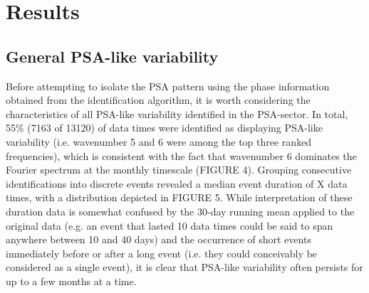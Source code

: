 \section{Results}

\subsection{General PSA-like variability}

Before attempting to isolate the PSA pattern using the phase information obtained from the identification algorithm, it is worth considering the characteristics of all PSA-like variability identified in the PSA-sector. In total, 55\% (7163 of 13120) of data times were identified as displaying PSA-like variability (i.e. wavenumber 5 and 6 were among the top three ranked frequencies), which is consistent with the fact that wavenumber 6 dominates the Fourier spectrum at the monthly timescale (FIGURE 4). Grouping consecutive identifications into discrete events revealed a median event duration of X data times, with a distribution depicted in FIGURE 5. While interpretation of these duration data is somewhat confused by the 30-day running mean applied to the original data (e.g. an event that lasted 10 data times could be said to span anywhere between 10 and 40 days) and the occurrence of short events immediately before or after a long event (i.e. they could conceivably be considered as a single event), it is clear that PSA-like variability often persists for up to a few months at a time.     

